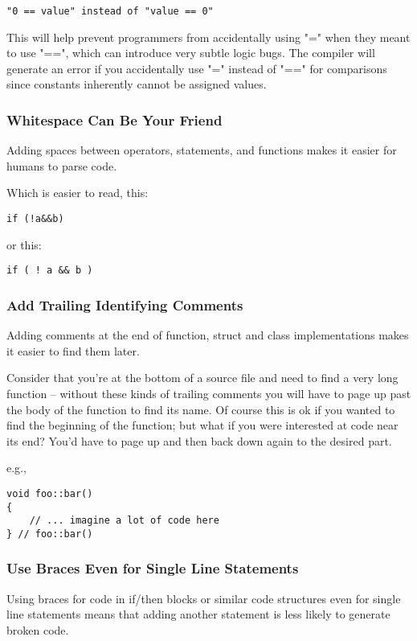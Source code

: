 \begin{verbatim}
"0 == value" instead of "value == 0"
\end{verbatim}

This will help prevent programmers from accidentally using "=" when they meant
to use "==", which can introduce very subtle logic bugs.  The compiler will
generate an error if you accidentally use "=" instead of "==" for comparisons
since constants inherently cannot be assigned values.

\subsubsection{Whitespace Can Be Your Friend}
Adding spaces between operators, statements, and functions makes it easier for
humans to parse code.

Which is easier to read, this:

\begin{verbatim}
if (!a&&b)
\end{verbatim}

or this:

\begin{verbatim}
if ( ! a && b )
\end{verbatim}

\subsubsection{Add Trailing Identifying Comments}
Adding comments at the end of function, struct and class implementations makes
it easier to find them later.

Consider that you're at the bottom of a source file and need to find a very
long function -- without these kinds of trailing comments you will have to page
up past the body of the function to find its name.  Of course this is ok if you
wanted to find the beginning of the function; but what if you were interested
at code near its end?  You'd have to page up and then back down again to the
desired part.

e.g.,

\begin{verbatim}
void foo::bar()
{ 
    // ... imagine a lot of code here 
} // foo::bar()
\end{verbatim}

\subsubsection{Use Braces Even for Single Line Statements}
Using braces for code in if/then blocks or similar code structures even for
single line statements means that adding another statement is less likely to
generate broken code.

